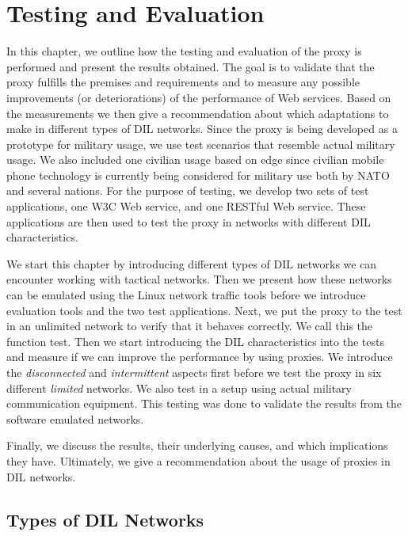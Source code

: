 \chapter{Testing and Evaluation}

\label{chapter:evaluation}

In this chapter, we outline how the testing and evaluation of the proxy is
performed and present the results obtained. The goal is to validate that the
proxy fulfills the premises and requirements and to measure any possible
improvements (or deteriorations) of the performance of Web services. Based on
the measurements we then give a recommendation about which adaptations to make
in different types of DIL networks. Since the proxy is being developed as a
prototype for military usage, we use test scenarios that resemble actual
military usage. We also included one civilian usage based on \gls{edge} since
civilian mobile phone technology is currently being considered for military use
both by NATO and several nations. For the purpose of testing, we develop two
sets of test applications, one W3C Web service, and one RESTful Web service.
These applications are then used to test the proxy in networks with different
DIL characteristics.

We start this chapter by introducing different types of DIL networks we can
encounter working with tactical networks. Then we present how these networks can
be emulated using the Linux network traffic tools before we introduce evaluation
tools and the two test applications. Next, we put the proxy to the test in an
unlimited network to verify that it behaves correctly. We call this the function
test. Then we start introducing the DIL characteristics into the tests and
measure if we can improve the performance by using proxies. We introduce the
\textit{disconnected} and \textit{intermittent} aspects first before we test the
proxy in six different \textit{limited} networks. We also test in a setup using
actual military communication equipment. This testing was done to validate the
results from the software emulated networks.

Finally, we discuss the results, their underlying causes, and which implications
they have. Ultimately, we give a recommendation about the usage of proxies in
DIL networks.

\section{Types of DIL Networks}


